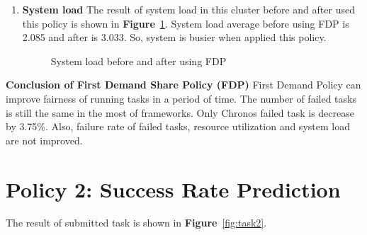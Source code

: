 \documentclass[12pt,oneside,openright,a4paper]{cpe-english-project}
\begin{document}
\begin{enumerate}
  \item \textbf{System load}
  \newline
  The result of system load in this cluster before and after used this policy is shown in \textbf{Figure}~\ref{fig:load1}. System load average before using FDP is 2.085 and after is 3.033. So, system is busier when applied this policy.
\begin{figure}[!h]\centering
    \setlength{\fboxrule}{0mm} %
    \setlength{\fboxsep}{0cm}
    \caption{System load before and after using FDP}\label{fig:load1}
\end{figure}
\end{enumerate}
\textbf{Conclusion of First Demand Share Policy (FDP)}
\newline
\hspace{10mm}First Demand Policy can improve fairness of running tasks in a period of time. The number of failed tasks is still the same in the most of frameworks. Only Chronos failed task is decrease by 3.75\%. Also, failure rate of failed tasks, resource utilization and system load are not improved. 


\section{Policy 2: Success Rate Prediction}  
\hspace{10mm}The result of submitted task is shown in \textbf{Figure}~\ref{fig:task2}.
\end{document}

